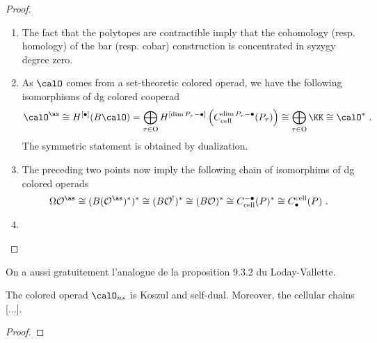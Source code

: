 \begin{proof} 

\leavevmode
    
\begin{enumerate}
    \item The fact that the polytopes are contractible imply that the cohomology (resp. homology) of the bar (resp. cobar) construction is concentrated in syzygy degree zero.
    \item As $\calO$ comes from a set-theoretic colored operad, we have the following isomorphisms of dg colored cooperad 
    \begin{eqnarray*} 
        \calO^{\as}\cong H^{[\bullet]}(B\calO)
        = \bigoplus_{\tau \in \mathrm{O}} H^{[\dim P_\tau-\bullet]}\left(C^{\dim P_\tau -\bullet}_{\mathrm{cell}}(P_\tau)\right)\cong \bigoplus_{\tau \in \mathrm{O}} \KK \cong \calO^{*} \ . 
    \end{eqnarray*} 
    The symmetric statement is obtained by dualization.
    \item The preceding two points now imply the following chain of isomorphims of dg colored operads 
    \[\Omega \mathcal{O}^{\as} \cong (B(\mathcal{O}^{\as})^{*})^{*} \cong (B\mathcal{O}^{!})^{*}\cong (B\mathcal{O})^{*}\cong C_{\mathrm{cell}}^{-\bullet}(P)^{*} \cong C_\bullet^{\mathrm{cell}}(P)  \ . \] 
    \item {}
\end{enumerate}
\end{proof}





On a aussi gratuitement l'analogue de la proposition 9.3.2 du Loday-Vallette. 



\begin{thm} \label{thm:OnsKoszul} The colored operad $\calO_{ns}$ is Koszul and self-dual. Moreover, the cellular chains [...].
\end{thm}
\begin{proof} 
\end{proof}


